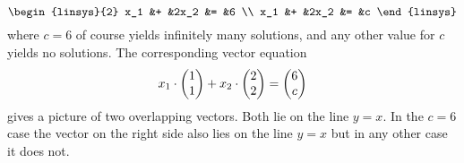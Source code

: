 \begin{exercises}
\begin{answer}
\begin{equation*}
        \begin{linsys}{2}
           x_1  &+  &2x_2  &=  &6  \\
           x_1  &+  &2x_2  &=  &c 
        \end{linsys}
      \end{equation*}
      where $c=6$ of course yields infinitely many solutions, and any other
      value for $c$ yields no solutions.  
      The corresponding vector equation
      \begin{equation*}
        x_1\cdot\begin{pmatrix} 1 \\ 1 \end{pmatrix}+x_2\cdot\begin{pmatrix} 2 \\ 2 \end{pmatrix}=\begin{pmatrix} 6 \\ c \end{pmatrix}
      \end{equation*}
      gives a picture of two overlapping vectors.
      Both lie on the line $y=x$.
      In the $c=6$ case the vector on the right side also lies on
      the line $y=x$ but in any other case it does not.
    \end{answer}  
\end{exercises}
\endinput
